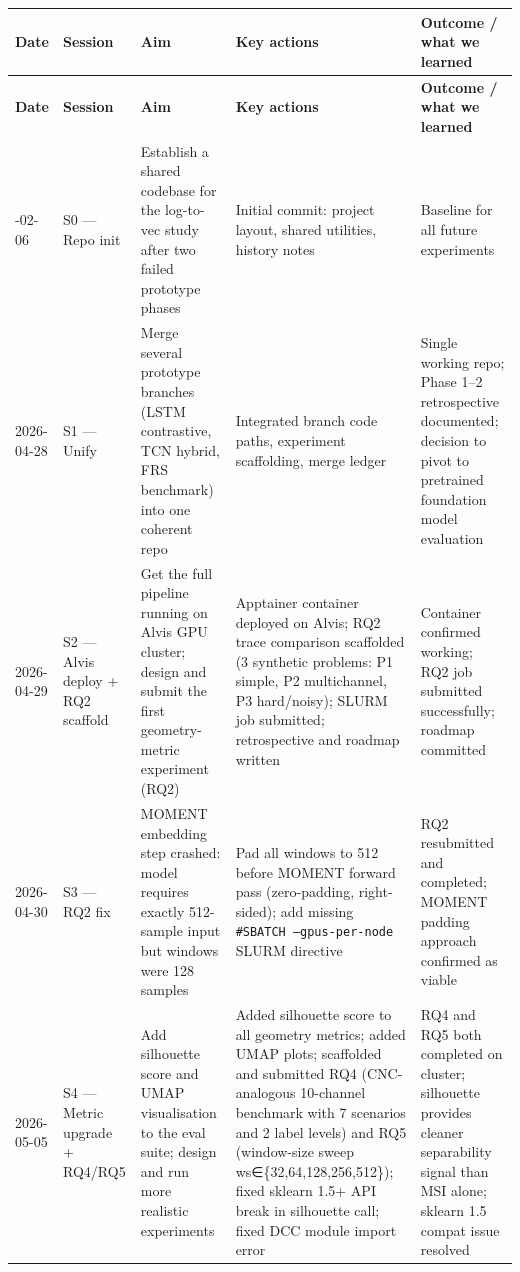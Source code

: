\documentclass[11pt,a4paper]{article}
\begin{document}
\begin{longtable}{|l|l|l|l|l|}
\hline
\textbf{Date} & \textbf{Session} & \textbf{Aim} & \textbf{Key actions} & \textbf{Outcome / what we learned} \\
\hline
\endfirsthead
\hline
\textbf{Date} & \textbf{Session} & \textbf{Aim} & \textbf{Key actions} & \textbf{Outcome / what we learned} \\
\hline
\endhead
\hline
\endfoot
2026-02-06 & S0 --- Repo init & Establish a shared codebase for the log-to-vec study after two failed prototype phases & Initial commit: project layout, shared utilities, history notes & Baseline for all future experiments \\
\hline
2026-04-28 & S1 --- Unify & Merge several prototype branches (LSTM contrastive, TCN hybrid, FRS benchmark) into one coherent repo & Integrated branch code paths, experiment scaffolding, merge ledger & Single working repo; Phase 1--2 retrospective documented; decision to pivot to pretrained foundation model evaluation \\
\hline
2026-04-29 & S2 --- Alvis deploy + RQ2 scaffold & Get the full pipeline running on Alvis GPU cluster; design and submit the first geometry-metric experiment (RQ2) & Apptainer container deployed on Alvis; RQ2 trace comparison scaffolded (3 synthetic problems: P1 simple, P2 multichannel, P3 hard/noisy); SLURM job submitted; retrospective and roadmap written & Container confirmed working; RQ2 job submitted successfully; roadmap committed \\
\hline
2026-04-30 & S3 --- RQ2 fix & MOMENT embedding step crashed: model requires exactly 512-sample input but windows were 128 samples & Pad all windows to 512 before MOMENT forward pass (zero-padding, right-sided); add missing \texttt{\#SBATCH --gpus-per-node} SLURM directive & RQ2 resubmitted and completed; MOMENT padding approach confirmed as viable \\
\hline
2026-05-05 & S4 --- Metric upgrade + RQ4/RQ5 & Add silhouette score and UMAP visualisation to the eval suite; design and run more realistic experiments & Added silhouette score to all geometry metrics; added UMAP plots; scaffolded and submitted RQ4 (CNC-analogous 10-channel benchmark with 7 scenarios and 2 label levels) and RQ5 (window-size sweep ws∈\{32,64,128,256,512\}); fixed sklearn 1.5+ API break in silhouette call; fixed DCC module import error & RQ4 and RQ5 both completed on cluster; silhouette provides cleaner separability signal than MSI alone; sklearn 1.5 compat issue resolved \\

\end{longtable}
\end{document}
